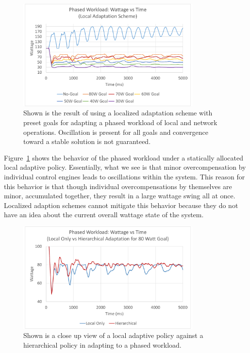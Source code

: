             \begin{figure}[htb!]
                \centering
                \includegraphics[width=0.82\textwidth]{Fig/phase_local.pdf}
                \caption[Phased Workload Using a Greedy Local Only Adaptive Policy]{Shown is the result of using a localized adaptation scheme with preset goals for adapting a phased workload of local and network operations. Oscillation is present for all goals and convergence toward a stable solution is not guaranteed.}
                \label{fig:phase_local}
            \end{figure}

            Figure~\ref{fig:phase_local} shows the behavior of the phased workload under a statically allocated local adaptive policy. Essentially, what we see is that minor overcompensation by individual control engines leads to oscillations within the system. This reason for this behavior is that though individual overcompensations by themselves are minor, accumulated together, they result in a large wattage swing all at once. Localized adaption schemes cannot mitigate this behavior because they do not have an idea about the current overall wattage state of the system. 

            \begin{figure}[htb!]
                \centering
                \includegraphics[width=0.82\textwidth]{Fig/phase_zoom.pdf}
                \caption[Phased Workload Local Only vs Hierarchal Adaptation (Watts vs Time)]{Shown is a close up view of a local adaptive policy against a hierarchical policy in adapting to a phased workload.}
                \label{fig:phase_zoom}
            \end{figure}

